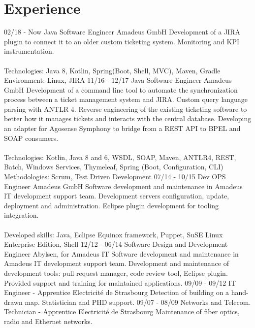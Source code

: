 \documentclass[]{friggeri-cv}
\begin{document}
\section{Experience}
\begin{entrylist}
  \entry
    {02/18 - Now}
    {Java Software Engineer}
    {Amadeus GmbH}
    {Development of a JIRA plugin to connect it to an older custom ticketing system. Monitoring and KPI instrumentation.\\
    \\
    Technologies: Java 8, Kotlin, Spring(Boot, Shell, MVC), Maven, Gradle \\
    Environment: Linux, JIRA}
  \entry
    {11/16 - 12/17}
    {Java Software Engineer}
    {Amadeus GmbH}
    {Development of a command line tool to automate the synchronization process between a ticket management system and JIRA. Custom query language parsing with ANTLR 4. Reverse engineering of the existing ticketing software to better how it manages tickets and interacts with the central database. Developing an adapter for Agosense Symphony to bridge from a REST API to BPEL and SOAP consumers.\\
    \\
    Technologies: Kotlin, Java 8 and 6, WSDL, SOAP, Maven, ANTLR4, REST, Batch, Windows Services, Thymeleaf, Spring (Boot, Configuration, CLI) \\
    Methodologies: Scrum, Test Driven Development}
    \entry
    {07/14 - 10/15}
    {Dev OPS Engineer}
    {Amadeus GmbH}
    {Software development and maintenance in Amadeus IT development support team.
Development servers configuration, update, deployment and administration.
Eclipse plugin development for tooling integration.\\
	\\
	Developed skills: Java, Eclipse Equinox framework, Puppet, SuSE Linux Enterprise Edition, Shell}
    \entry
    {12/12 - 06/14}
    {Software Design and Development Engineer}
    {Abylsen, for Amadeus IT}
    {Software development and maintenance in Amadeus IT development support team.
Development and maintenance of development tools: pull request manager, code review tool, Eclipse plugin.
Provided support and training for maintained applications.}
    \entry
    {09/09 - 09/12}
    {IT Engineer - Apprentice}
    {Electricité de Strasbourg}
    {Detection of building on a hand-drawn map. Statistician and PHD support.}
    \entry
    {09/07 - 08/09}
    {Networks and Telecom. Technician - Apprentice}
    {Electricité de Strasbourg}
    {Maintenance of fiber optics, radio and Ethernet networks.}
\end{entrylist}
\end{document}
